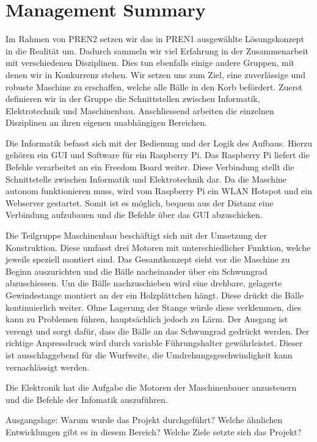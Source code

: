 \section{Management Summary}

Im Rahmen von PREN2 setzen wir das in PREN1 ausgewählte Lösungskonzept in die Realität um. Dadurch sammeln wir viel Erfahrung in der Zusammenarbeit mit verschiedenen Disziplinen. Dies tun ebenfalls einige andere Gruppen, mit denen wir in Konkurrenz stehen. Wir setzen uns zum Ziel, eine zuverlässige und robuste Maschine zu erschaffen, welche alle Bälle in den Korb befördert.
Zuerst definieren wir in der Gruppe die Schnittstellen zwischen Informatik, Elektrotechnik und Maschinenbau. Anschliessend arbeiten die einzelnen Disziplinen an ihren eigenen unabhängigen Bereichen.

Die Informatik befasst sich mit der Bedienung und der Logik des Aufbaus. Hierzu gehören ein GUI und Software für ein Raspberry Pi. Das Raspberry Pi liefert die Befehle verarbeitet an ein Freedom Board weiter. Diese Verbindung stellt die Schnittstelle zwischen Informatik und Elektrotechnik dar. Da die Maschine autonom funktionieren muss, wird vom Raspberry Pi ein WLAN Hotspot und ein Webserver gestartet. Somit ist es möglich, bequem aus der Distanz eine Verbindung aufzubauen und die Befehle über das GUI abzuschicken.

Die Teilgruppe Maschinenbau beschäftigt sich mit der Umsetzung der Konstruktion. Diese umfasst drei Motoren mit unterschiedlicher Funktion, welche jeweils speziell montiert sind. Das Gesamtkonzept sieht vor die Maschine zu Beginn auszurichten und die Bälle nacheinander über ein Schwungrad abzuschiessen. Um die Bälle nachzuschieben wird eine drehbare, gelagerte Gewindestange montiert an der ein Holzplättchen hängt. Diese drückt die Bälle kontinuierlich weiter. Ohne Lagerung der Stange würde diese verklemmen, dies kann zu Problemen führen, hauptsächlich jedoch zu Lärm. Der Ausgang ist verengt und sorgt dafür, dass die Bälle an das Schwungrad gedrückt werden. Der richtige Anpressdruck wird durch variable Führungshalter gewährleistet. Dieser ist ausschlaggebend für die Wurfweite, die Umdrehungsgeschwindigkeit kann vernachlässigt werden.

Die Elektronik hat die Aufgabe die Motoren der Maschinenbauer anzusteuern und die Befehle der Infomatik auszuführen.



Ausgangslage: Warum wurde das Projekt durchgeführt? Welche ähnlichen Entwicklungen gibt es in diesem Bereich? Welche Ziele setzte sich das Projekt?

